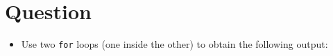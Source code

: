 




\docCopyright

\section{Question}

\begin{itemize}

  \item Use two \texttt{for} loops (one inside the other) to obtain
    the following output:
    \inputminted[label=Output]{text}{\docCodeDir/.for-nested.gen.output}

\end{itemize}



